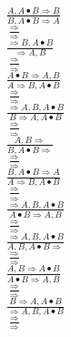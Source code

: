\documentclass[11pt]{article}
\begin{document}
\begin{center}
\bigskip
\\$\frac{A, A\bullet B\Rightarrow B}{B, A\bullet B\Rightarrow A}$
\bigskip
\\$\frac{\Rightarrow }{\Rightarrow }$
\bigskip
\\$\frac{\Rightarrow B, A\bullet B}{\Rightarrow A, B}$
\bigskip
\\$\frac{\Rightarrow }{\Rightarrow }$
\bigskip
\\$\frac{A\bullet B\Rightarrow A, B}{A\Rightarrow B, A\bullet B}$
\bigskip
\\$\frac{\Rightarrow }{\Rightarrow }$
\bigskip
\\$\frac{\Rightarrow A, B, A\bullet B}{B\Rightarrow A, A\bullet B}$
\bigskip
\\$\frac{\Rightarrow }{\Rightarrow }$
\bigskip
\\$\frac{A, B\Rightarrow }{B, A\bullet B\Rightarrow }$
\bigskip
\\$\frac{\Rightarrow }{\Rightarrow }$
\bigskip
\\$\frac{B, A\bullet B\Rightarrow A}{A\Rightarrow B, A\bullet B}$
\bigskip
\\$\frac{\Rightarrow }{\Rightarrow }$
\bigskip
\\$\frac{\Rightarrow A, B, A\bullet B}{A\bullet B\Rightarrow A, B}$
\bigskip
\\$\frac{\Rightarrow }{\Rightarrow }$
\bigskip
\\$\frac{\Rightarrow A, B, A\bullet B}{A, B, A\bullet B\Rightarrow }$
\bigskip
\\$\frac{\Rightarrow }{\Rightarrow }$
\bigskip
\\$\frac{A, B\Rightarrow A\bullet B}{A\bullet B\Rightarrow A, B}$
\bigskip
\\$\frac{\Rightarrow }{\Rightarrow }$
\bigskip
\\$\frac{B\Rightarrow A, A\bullet B}{\Rightarrow A, B, A\bullet B}$
\bigskip
\\$\frac{\Rightarrow }{\Rightarrow }$
\bigskip
\\
\end{center}
\end{document}
